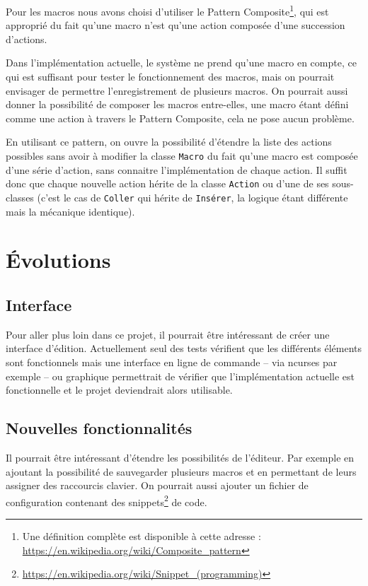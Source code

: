 \documentclass[french]{article}
\begin{document}
Pour les macros nous avons choisi d'utiliser le Pattern Composite\footnote{Une définition complète est disponible à cette adresse : \url{https://en.wikipedia.org/wiki/Composite_pattern}}, qui est approprié du fait qu'une macro n'est qu'une action composée d'une succession d'actions.

Dans l'implémentation actuelle, le système ne prend qu'une macro en compte, ce qui est suffisant pour tester le fonctionnement des macros, mais on pourrait envisager de permettre l'enregistrement de plusieurs macros. On pourrait aussi donner la possibilité de composer les macros entre-elles, une macro étant défini comme une action à travers le Pattern Composite, cela ne pose aucun problème.

En utilisant ce pattern, on ouvre la possibilité d'étendre la liste des actions possibles sans avoir à modifier la classe \texttt{Macro} du fait qu'une macro est composée d'une série d'action, sans connaitre l'implémentation de chaque action. Il suffit donc que chaque nouvelle action hérite de la classe \texttt{Action} ou d'une de ses sous-classes (c'est le cas de \texttt{Coller} qui hérite de \texttt{Insérer}, la logique étant différente mais la mécanique identique). 


\section{Évolutions}

\subsection{Interface}

Pour aller plus loin dans ce projet, il pourrait être intéressant de créer une interface d'édition. Actuellement seul des tests vérifient que les différents éléments sont fonctionnels mais une interface en ligne de commande -- via ncurses par exemple -- ou graphique permettrait de vérifier que l'implémentation actuelle est fonctionnelle et le projet deviendrait alors utilisable.

\subsection{Nouvelles fonctionnalités}

Il pourrait être intéressant d'étendre les possibilités de l'éditeur. Par exemple en ajoutant la possibilité de sauvegarder plusieurs macros et en permettant de leurs assigner des raccourcis clavier. On pourrait aussi ajouter un fichier de configuration contenant des snippets\footnote{\url{https://en.wikipedia.org/wiki/Snippet_(programming)}} de code. 
\end{document}
